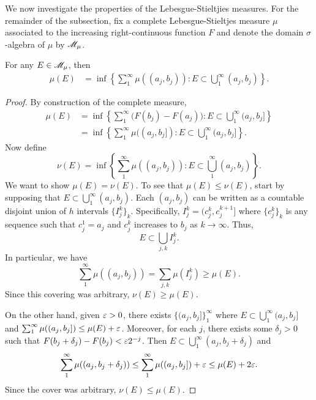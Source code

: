 \documentclass[12pt]{article} %
\begin{document}
We now investigate the properties of the Lebesgue-Stieltjies measures. For the remainder of the subsection, fix a complete Lebesgue-Stieltjes measure $\mu$ associated to the increasing right-continuous function $F$ and denote the domain $\sigma$-algebra of $\mu$ by $\mathscr{M}_\mu$.

\begin{lemma}\label{lem:lebesgue-stieltjes-alt-definition}
    For any $E \in \mathscr{M}_\mu$, then \begin{align*}
        \mu(E) &= \inf \left\{ \sum_1^\infty \mu((a_j, b_j)) : E \subset \bigcup_1^\infty (a_j, b_j) \right\}.
    \end{align*}
\end{lemma}

\begin{proof}
    By construction of the complete measure, \begin{align*}
        \mu(E) &= \inf \left\{ \sum_1^\infty \Big(F(b_j) - F(a_j) \Big) : E \subset \bigcup_1^\infty (a_j, b_j] \right\}\\
        &= \inf \left\{ \sum_1^\infty \mu((a_j, b_j]) : E \subset \bigcup_1^\infty (a_j, b_j] \right\}.
    \end{align*}
    Now define \[\nu(E) = \inf \left\{ \sum_1^\infty \mu((a_j, b_j)) : E \subset \bigcup_1^\infty (a_j, b_j) \right\}.\] We want to show $\mu(E) = \nu(E)$. To see that $\mu(E) \leq \nu(E)$, start by supposing that $E \subset \bigcup_1^{\infty} (a_j, b_j)$. Each $(a_j, b_j)$ can be written as a countable disjoint union of $h$ intervals $\{I_j^k\}_k$. Specifically, $I_j^k = (c_j^k, c_j^{k+1}]$ where $\{c_j^k\}_k$ is any sequence such that $c_j^1 = a_j$ and $c_j^k$ increases to $b_j$ as $k \to \infty$. Thus, \[E \subset \bigcup_{j, k} I_j^k.\] In particular, we have \[\sum_1^{\infty} \mu((a_j, b_j)) = \sum_{j, k} \mu(I_j^k) \geq \mu(E).\] Since this covering was arbitrary, $\nu(E) \geq \mu(E)$.

    On the other hand, given $\varepsilon > 0$, there exists $\{(a_j, b_j]\}_1^{\infty}$ where $E \subset \bigcup_1^{\infty} (a_j, b_j]$ and $\sum_1^{\infty} \mu((a_j, b_j]) \leq \mu(E) + \varepsilon$. Moreover, for each $j$, there exists some $\delta_j > 0$ such that $F(b_j + \delta_j) - F(b_j) < \varepsilon 2^{-j}$. Then $E \subset \bigcup_1^{\infty} (a_j, b_j + \delta_j)$ and \[\sum_1^\infty \mu((a_j, b_j + \delta_j)) \leq \sum_1^\infty \mu((a_j, b_j]) + \varepsilon \leq \mu(E) + 2\varepsilon.\] Since the cover was arbitrary, $\nu(E) \leq \mu(E)$.
\end{proof}
\end{document}
